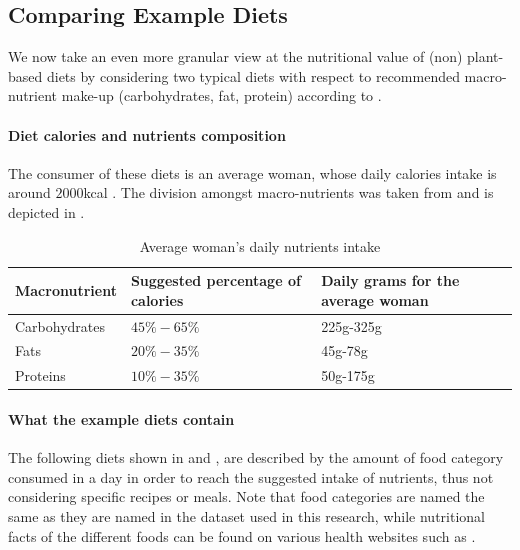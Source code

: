 \documentclass{article}
\begin{document}



\subsection{Comparing Example Diets}
We now take an even more granular view at the nutritional value of (non) plant-based diets by considering two typical diets with respect to recommended macro-nutrient make-up (carbohydrates, fat, protein) according to \cite{Healthline}.

\paragraph*{Diet calories and nutrients composition}
The consumer of these diets is an average woman, whose daily calories intake is around $2000$kcal \cite{NHS}. The division amongst macro-nutrients was taken from \citet{Healthline} and is depicted in  .

\begin{table}[h]
  \caption{Average woman's daily nutrients intake}
  \label{tbl:composition}
  \centering
  \begin{tabular}{lll}
    \toprule
    Macronutrient     & Suggested percentage of calories   & Daily grams for the average woman  \\
    \midrule
    Carbohydrates & $45\%-65\%$ &  225g-325g  \\
    Fats    & $20\%-35\% $  & 45g-78g \\
    Proteins & $10\%-35\%$ & 50g-175g \\
    \bottomrule
  \end{tabular}
\end{table}

\paragraph*{What the example diets contain}
The following diets shown in  and , are described by the amount of food category consumed in a day in order to reach the suggested intake of nutrients, thus not considering specific recipes or meals. Note that food categories are named the same as they are named in the dataset used in this research, while nutritional facts of the different foods can  be found on various  health websites such as \cite{Healthline}. 
\end{document}

